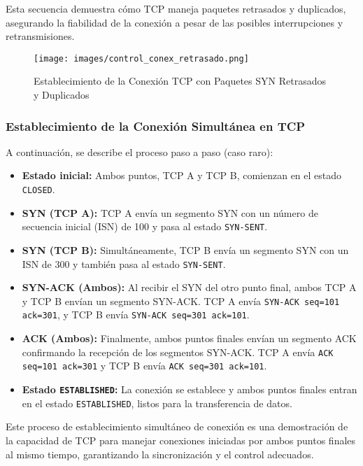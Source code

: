 \documentclass[a4paper,12pt]{article}
\begin{document}
Esta secuencia demuestra cómo TCP maneja paquetes retrasados y duplicados, asegurando la fiabilidad de la conexión a pesar de las posibles interrupciones y retransmisiones.

\begin{figure}[H]
    \centering
    \texttt{[image: images/control\_conex\_retrasado.png]}
    \caption{Establecimiento de la Conexión TCP con Paquetes SYN Retrasados y Duplicados}
    \label{fig:tcp_syn_retrasados_duplicados}
\end{figure}

\subsubsection{Establecimiento de la Conexión Simultánea en TCP}

A continuación, se describe el proceso paso a paso (caso raro):

\begin{itemize}
    \item \textbf{Estado inicial:} Ambos puntos, TCP A y TCP B, comienzan en el estado \texttt{CLOSED}.
    \item \textbf{SYN (TCP A):} TCP A envía un segmento SYN con un número de secuencia inicial (ISN) de 100 y pasa al estado \texttt{SYN-SENT}.
    \item \textbf{SYN (TCP B):} Simultáneamente, TCP B envía un segmento SYN con un ISN de 300 y también pasa al estado \texttt{SYN-SENT}.
    \item \textbf{SYN-ACK (Ambos):} Al recibir el SYN del otro punto final, ambos TCP A y TCP B envían un segmento SYN-ACK. TCP A envía \texttt{SYN-ACK seq=101 ack=301}, y TCP B envía \texttt{SYN-ACK seq=301 ack=101}.
    \item \textbf{ACK (Ambos):} Finalmente, ambos puntos finales envían un segmento ACK confirmando la recepción de los segmentos SYN-ACK. TCP A envía \texttt{ACK seq=101 ack=301} y TCP B envía \texttt{ACK seq=301 ack=101}.
    \item \textbf{Estado \texttt{ESTABLISHED}:} La conexión se establece y ambos puntos finales entran en el estado \texttt{ESTABLISHED}, listos para la transferencia de datos.
\end{itemize}

Este proceso de establecimiento simultáneo de conexión es una demostración de la capacidad de TCP para manejar conexiones iniciadas por ambos puntos finales al mismo tiempo, garantizando la sincronización y el control adecuados.
\end{document}
